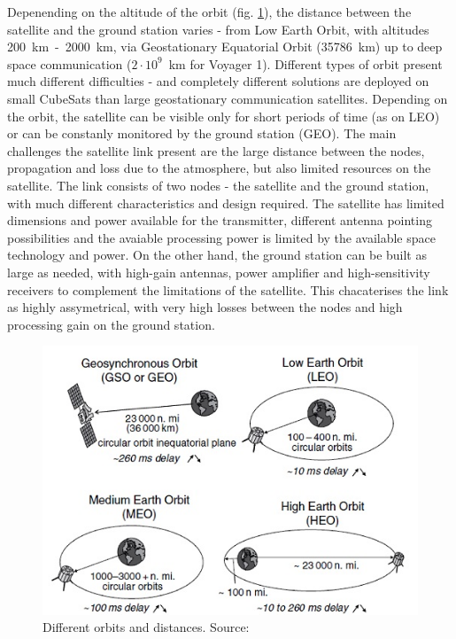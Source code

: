 Depenending on the altitude of the orbit (fig. \ref{intro:orbits}), the distance between the satellite and the ground station varies - from Low Earth Orbit, with altitudes \SI{200}{\kilo\meter}~-~\SI{2000}{\kilo\meter}, via Geostationary Equatorial Orbit (\SI{35786}{\kilo\meter}) up to deep space communication ($2\cdot 10^{9}$~km for Voyager 1). Different types of orbit present much different difficulties - and completely different solutions are deployed on small CubeSats than large geostationary communication satellites. Depending on the orbit, the satellite can be visible only for short periods of time (as on LEO) or can be constanly monitored by the ground station (GEO). The main challenges the satellite link present are the large distance between the nodes, propagation and loss due to the atmosphere, but also limited resources on the satellite. The link consists of two nodes - the satellite and the ground station, with much different characteristics and design required. The satellite has limited dimensions and power available for the transmitter, different antenna pointing possibilities and the avaiable processing power is limited by the available space technology and power. On the other hand, the ground station can be built as large as needed, with high-gain antennas, power amplifier and high-sensitivity receivers to complement the limitations of the satellite. This chacaterises the link as highly assymetrical, with very high losses between the nodes and high processing gain on the ground station.
\begin{figure}
    \centering
    \includegraphics[width=0.5\paperwidth]{img/2/orbit_types.jpg}
    \caption{Different orbits and distances. Source: \cite{satcom_decription}}
    \label{intro:orbits}
\end{figure}

